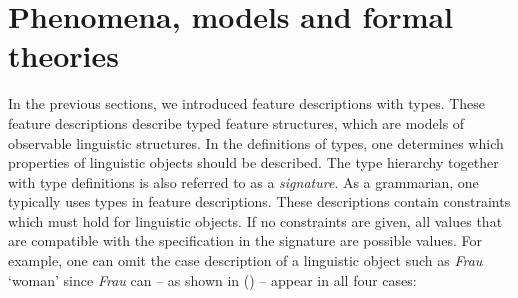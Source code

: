 \section{Phenomena, models and formal theories}
\label{sec-modelle-theorien}

In the previous sections, we introduced feature descriptions with types. These feature descriptions describe typed
feature structures, which are models of observable linguistic structures. In the definitions of types, one determines which properties of linguistic objects should be described.
The type hierarchy together with type definitions is also referred to as a \emph{signature}.
As a grammarian, one typically uses types in feature descriptions. These descriptions contain
constraints which must hold for linguistic objects. If no constraints are given, all values that are
compatible with the specification in the signature are possible values. For example, one can omit the case
description of a linguistic object such as \emph{Frau} `woman' since \emph{Frau} can -- as shown in () -- appear in all four cases:

